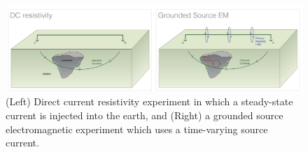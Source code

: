\begin{figure}
    \begin{center}
    \includegraphics[width=\textwidth]{figures/intro/grounded-sources.png}
    \end{center}
\caption{
    (Left) Direct current resistivity experiment in which a steady-state current is injected into the earth, and
    (Right) a grounded source electromagnetic experiment which uses a time-varying source current.
}
\label{fig:grounded-sources}
\end{figure}

